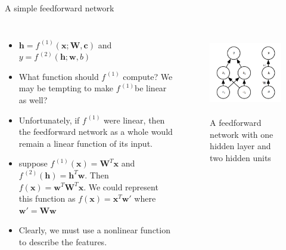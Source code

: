 \documentclass[10pt]{beamer}
\begin{document}
	\begin{frame}{A simple feedforward network}
		\begin{columns}[T]
			\begin{itemize}
				\item $\bm{h}=f^{\,(1)}(\bm{x};\bm{W},\bm{c})$ and $y=f^{\,(2)}(\bm{h};\bm{w},b)$
				\item What function should $f^{\,(1)}$ compute? We may be tempting to make $f^{\,(1)}$be linear as well?
				\onslide<2->
				\item Unfortunately, if $f^{\,(1)}$ were linear, then the feedforward network as a whole would remain a linear function of its input.
				\onslide<3->
				\item suppose $f^{\,(1)}(\bm{x})=\bm{W}^T\bm{x}$ and $f^{\,(2)}(\bm{h})=\bm{h}^T\bm{w}$. Then $f(\bm{x})=\bm{w}^T\bm{W}^T\bm{x}$. We could represent this function as $f(\bm{x})=\bm{x}^T\bm{w'}$ where $\bm{w'}=\bm{Ww}$
				\onslide<4->
				\item Clearly, we must use a nonlinear function to describe the features.
			\end{itemize}
			
			\setcounter{figure}{\thefigure-1}
			\begin{figure}
				\caption{A feedforward network with one hidden layer and two hidden units}
				\includegraphics[height=10em]{figures/network-one-hidden-layer-two-hidden-unit.png}
			\end{figure}
		\end{columns}
	\end{frame}
\end{document}
